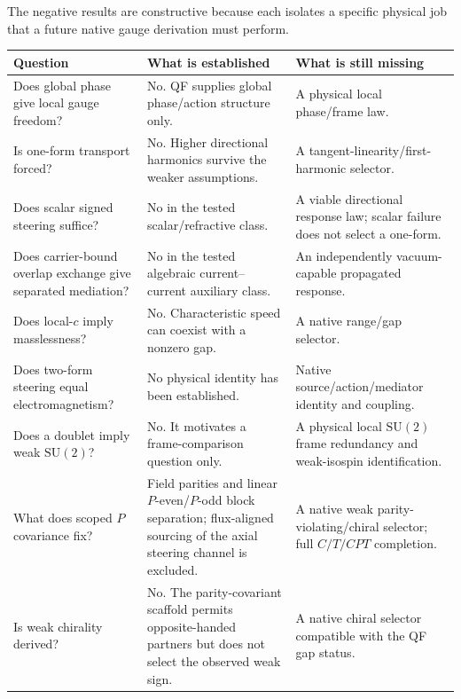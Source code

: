 \documentclass[11pt]{article}
\theoremstyle{definition}
\newcommand{\SUtwo}{\mathrm{SU}(2)}
\begin{document}
The negative results are constructive because each isolates a specific physical job that a future native gauge derivation must perform.

\renewcommand{\arraystretch}{1.18}
\small
\begin{center}
\begin{tabularx}{\textwidth}{>{\raggedright\arraybackslash}p{} >{\raggedright\arraybackslash}X >{\raggedright\arraybackslash}X}
\toprule
\textbf{Question} & \textbf{What is established} & \textbf{What is still missing}\\
\midrule
Does global phase give local gauge freedom? & No.  QF supplies global phase/action structure only. & A physical local phase/frame law.\\
Is one-form transport forced? & No. Higher directional harmonics survive the weaker assumptions. & A tangent-linearity/first-harmonic selector.\\
Does scalar signed steering suffice? & No in the tested scalar/refractive class. & A viable directional response law; scalar failure does not select a one-form.\\
Does carrier-bound overlap exchange give separated mediation? & No in the tested algebraic current--current auxiliary class. & An independently vacuum-capable propagated response.\\
Does local-$c$ imply masslessness? & No. Characteristic speed can coexist with a nonzero gap. & A native range/gap selector.\\
Does two-form steering equal electromagnetism? & No physical identity has been established. & Native source/action/mediator identity and coupling.\\
Does a doublet imply weak $\SUtwo$? & No. It motivates a frame-comparison question only. & A physical local $\SUtwo$ frame redundancy and weak-isospin identification.\\
What does scoped $P$ covariance fix? & Field parities and linear $P$-even/$P$-odd block separation; flux-aligned sourcing of the axial steering channel is excluded. & A native weak parity-violating/chiral selector; full $C/T/CPT$ completion.\\
Is weak chirality derived? & No.  The parity-covariant scaffold permits opposite-handed partners but does not select the observed weak sign. & A native chiral selector compatible with the QF gap status.\\
\bottomrule
\end{tabularx}
\end{center}
\normalsize
\end{document}
